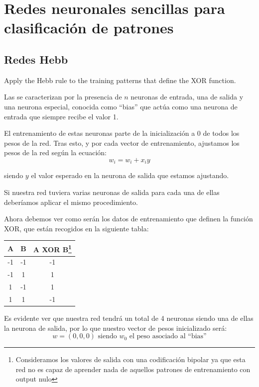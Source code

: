 \section{Redes neuronales sencillas para clasificación de patrones}
\subsection{Redes Hebb}

\begin{problem}[1]
Apply the Hebb rule to the training patterns that define the XOR function.
\solution

Las  se caracterizan por la presencia de $n$ neuronas de entrada, una de salida y una neurona especial, conocida como ``bias'' que actúa como una neurona de entrada que siempre recibe el valor 1.

El entrenamiento de estas neuronas parte de la inicialización a 0 de todos los pesos de la red. Tras esto, y por cada vector de entrenamiento, ajustamos los pesos de la red según la ecuación:
\begin{equation}\label{eq:hebbRule}
w_i=w_i+x_iy
\end{equation}

siendo $y$ el valor esperado en la neurona de salida que estamos ajustando.

Si nuestra red tuviera varias neuronas de salida para cada una de ellas deberíamos aplicar el mismo procedimiento.

Ahora debemos ver como serán los datos de entrenamiento que definen la función XOR, que están recogidos en la siguiente tabla:
\begin{center}
\begin{tabular}{|c|c|c|}
\hline
\textbf{A} & \textbf{B} & \textbf{A XOR B}\footnote{Consideramos los valores de salida con una codificación bipolar ya que esta red no es capaz de aprender nada de aquellos patrones de entrenamiento con output nulo} \\
\hline
-1 & -1 & -1 \\
-1 & 1 & 1 \\
1 & -1 & 1 \\
1 & 1 & -1 \\
\hline
\end{tabular}
\end{center}

Es evidente ver que nuestra red tendrá un total de 4 neuronas siendo una de ellas la neurona de salida, por lo que nuestro vector de pesos inicializado será:
\[w = (0,0,0) \text{ siendo } w_0 \text{ el peso asociado al ``bias''}\]


\end{problem}
